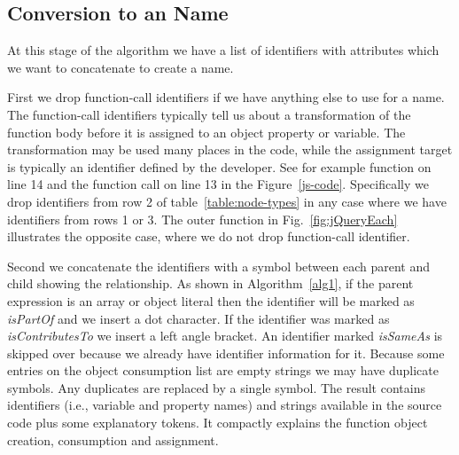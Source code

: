 \documentclass[10pt, preprint]{sigplanconf}
\begin{document}
\begin{table}
\centering
{}
\caption{JavaScript Expression Reduction to a Name. Expressions which match an entry in the pattern column are converted as shown in the Name column. Here \texttt{e} indicates an expression, \texttt{id} indicates an identifier, \texttt{+} means string concatenation and \texttt{Name()} means we apply the pattern matching recursively.}
\label{expression-reduction} 
\end{table}    

\subsection{Conversion to an Name}
\label{sec:concatenation}
At this stage of the algorithm we have a list of identifiers with attributes which we want to concatenate to create a name. 

First we drop function-call identifiers if we have anything else to use for a name. The function-call identifiers typically tell us about a transformation of the function body before it is assigned to an object property or variable. The transformation may be used many places in the code, while the assignment target is typically an identifier defined by the developer.  See for example function on line 14 and the function call on line 13 in the Figure~\ref{js-code}. Specifically we drop identifiers from row 2 of table~\ref{table:node-types} in any case where we have identifiers from rows 1 or 3.  The outer function in Fig.~\ref{fig:jQueryEach} illustrates the opposite case, where we do not drop function-call identifier. 
 
Second we concatenate the identifiers with a symbol between each parent and child showing the relationship.  As shown in Algorithm~\ref{alg1},  
if the parent expression is an array or object literal then the identifier will be marked  as \textit{isPartOf} and we insert a dot character. If the identifier was marked as  \textit{isContributesTo} we insert a left angle bracket. An identifier marked \textit{isSameAs} is skipped over because we already have identifier information for it. Because some entries on the object consumption list are empty strings we may have duplicate symbols. Any duplicates are replaced by a single symbol. The result contains identifiers (i.e., variable and property names) and strings available in the source code plus some explanatory tokens. It compactly explains the function object creation, consumption and assignment.
 
\end{document}
